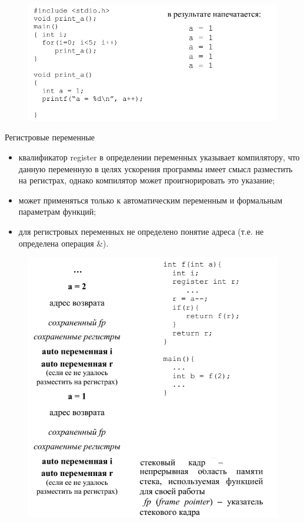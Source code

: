 \documentclass{beamer}
\begin{document}
\begin{frame}
\begin{figure}[h]
\centering
\includegraphics[scale=0.5]{images/lec03-pic12.png}
\end{figure}
\end{frame}

\begin{frame}
Регистровые переменные
\begin{itemize}
\item квалификатор register в определении переменных указывает компилятору, что данную переменную в целях ускорения программы имеет смысл разместить на регистрах, однако компилятор может проигнорировать это указание;
\item может применяться только к автоматическим переменным и формальным параметрам функций;
\item для регистровых переменных не определено понятие адреса  (т.е. не определена операция \&).
\end{itemize}
\end{frame}

\begin{frame}
\begin{figure}[h]
\centering
\includegraphics[scale=0.5]{images/lec03-pic13.png}
\end{figure}
\end{frame}
\end{document}
